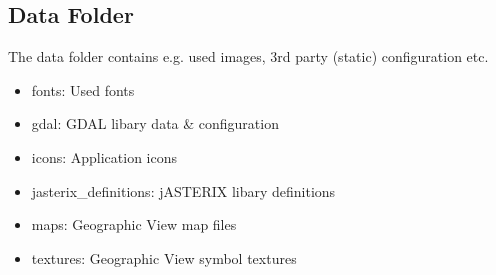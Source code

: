 \begin{itemize}
\end{itemize}

\subsection{Data Folder}
\label{sec:appendix_config_data_folder}

The data folder contains e.g. used images, 3rd party (static) configuration etc.

\begin{itemize}
\item fonts: Used fonts
\item gdal: GDAL libary data \& configuration
\item icons: Application icons
\item jasterix\_definitions: jASTERIX libary definitions
\item maps: Geographic View map files
\item textures: Geographic View symbol textures
\end{itemize}

